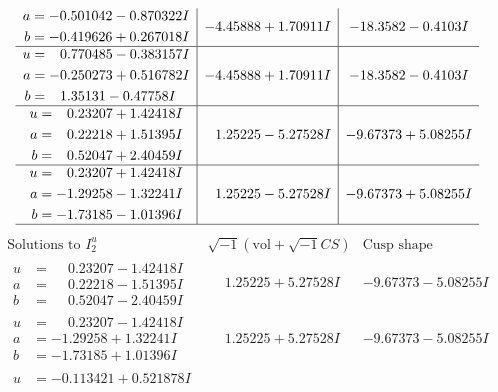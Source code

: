 \documentclass[1p]{elsarticle_modified}
\theoremstyle{definition}
\newcommand{\I}{\sqrt{-1}}
\begin{document}
$$\begin{array}{c|c|c}
\begin{aligned}
a &= -0.501042 - 0.870322 I \\
b &= -0.419626 + 0.267018 I\end{aligned}
 & -4.45888 + 1.70911 I & -18.3582 - 0.4103 I \\ \hline\begin{aligned}
u &= \phantom{-}0.770485 - 0.383157 I \\
a &= -0.250273 + 0.516782 I \\
b &= \phantom{-}1.35131 - 0.47758 I\end{aligned}
 & -4.45888 + 1.70911 I & -18.3582 - 0.4103 I \\ \hline\begin{aligned}
u &= \phantom{-}0.23207 + 1.42418 I \\
a &= \phantom{-}0.22218 + 1.51395 I \\
b &= \phantom{-}0.52047 + 2.40459 I\end{aligned}
 & \phantom{-}1.25225 - 5.27528 I & -9.67373 + 5.08255 I \\ \hline\begin{aligned}
u &= \phantom{-}0.23207 + 1.42418 I \\
a &= -1.29258 - 1.32241 I \\
b &= -1.73185 - 1.01396 I\end{aligned}
 & \phantom{-}1.25225 - 5.27528 I & -9.67373 + 5.08255 I\\
 \hline 
 \end{array}$$\newpage$$\begin{array}{c|c|c}  
\text{Solutions to }I^u_{2}& \I (\text{vol} + \sqrt{-1}CS) & \text{Cusp shape}\\
 \hline 
\begin{aligned}
u &= \phantom{-}0.23207 - 1.42418 I \\
a &= \phantom{-}0.22218 - 1.51395 I \\
b &= \phantom{-}0.52047 - 2.40459 I\end{aligned}
 & \phantom{-}1.25225 + 5.27528 I & -9.67373 - 5.08255 I \\ \hline\begin{aligned}
u &= \phantom{-}0.23207 - 1.42418 I \\
a &= -1.29258 + 1.32241 I \\
b &= -1.73185 + 1.01396 I\end{aligned}
 & \phantom{-}1.25225 + 5.27528 I & -9.67373 - 5.08255 I \\ \hline\begin{aligned}
u &= -0.113421 + 0.521878 I \\

\end{aligned}
\end{array}$$
\end{document}
